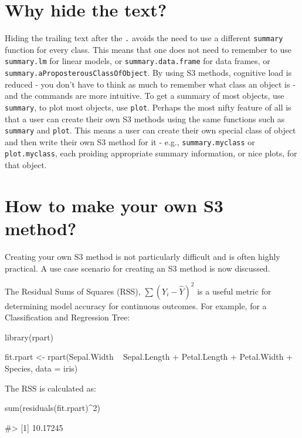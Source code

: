 \section{Why hide the text?}\label{why-hide-the-text}

Hiding the trailing text after the \texttt{.} avoids the need to use a
different \texttt{summary} function for every class. This means that one
does not need to remember to use \texttt{summary.lm} for linear models,
or \texttt{summary.data.frame} for data frames, or
\texttt{summary.aProposterousClassOfObject}. By using S3 methods,
cognitive load is reduced - you don't have to think as much to remember
what class an object is - and the commands are more intuitive. To get a
summary of most objects, use \texttt{summary}, to plot most objects, use
\texttt{plot}. Perhaps the most nifty feature of all is that a user can
create their own S3 methods using the same functions such as
\texttt{summary} and \texttt{plot}. This means a user can create their
own special class of object and then write their own S3 method for it -
e.g., \texttt{summary.myclass} or \texttt{plot.myclass}, each proiding
appropriate summary information, or nice plots, for that object.

\section{How to make your own S3
method?}\label{how-to-make-your-own-s3-method}

Creating your own S3 method is not particularly difficult and is often
highly practical. A use case scenario for creating an S3 method is now
discussed.

The Residual Sums of Squares (RSS), \(\sum(Y_i - \hat{Y})^2\) is a
useful metric for determining model accuracy for continuous outcomes.
For example, for a Classification and Regression Tree:

\begin{Schunk}
\begin{Sinput}
library(rpart)

fit.rpart <- rpart(Sepal.Width ~ Sepal.Length + Petal.Length + Petal.Width + Species, data = iris)
\end{Sinput}
\end{Schunk}

The RSS is calculated as:

\begin{Schunk}
\begin{Sinput}
sum(residuals(fit.rpart)^2)
\end{Sinput}
\begin{Soutput}
#> [1] 10.17245
\end{Soutput}
\end{Schunk}

